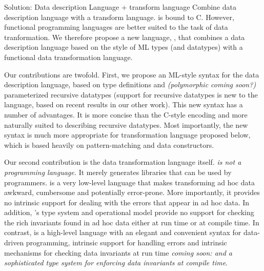 
Solution: Data description Language + transform language
Combine data description language with a transform language.
\pads{} is bound to C. However, functional programming languages are
better suited to the task of data tranformation. We therefore propose
a new language, \datatype{}, that combines a data description language
based on the style of ML types (and datatypes) with a functional data
transformation language. 

Our contributions are twofold. First, we propose an ML-style syntax
for the \pads{} data description language, based on type definitions
and {\em(polymorphic coming soon?)} parameterized recursive datatypes
(support for recursive datatypes is new to the \pads{} language, based
on recent results in our other work). This new syntax has a number of
advantages. It is more concise than the C-style encoding and more
naturally suited to describing recursive datatypes. Most importantly,
the new syntax is much more appropriate for transformation language
proposed below, which is based heavily on pattern-matching and data
constructors.

Our second contribution is the data transformation language itself.
{\em \pads{} is not a programming language.}  It merely generates
libraries that can be used by \C{} programmers.  \C{} is a very
low-level language that makes transforming ad hoc data awkward,
cumbersome and potentially error-prone.  More importantly, it provides
no intrinsic support for dealing with the errors that appear in ad hoc
data.  In addition, \C's type system and operational model provide no
support for checking the rich invariants found in ad hoc data either
at run time or at compile time.  In contrast, \datatype{} is a
high-level language with an elegant and convenient syntax for
data-driven programming, intrinsic support for handling errors and
intrinsic mechanisms for checking data invariants at run time {\em
  coming soon: and a sophisticated type system for enforcing data
  invariants at compile time}. 

